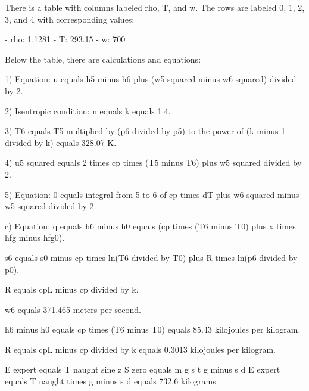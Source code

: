 There is a table with columns labeled rho, T, and w. The rows are labeled 0, 1, 2, 3, and 4 with corresponding values:

- rho: 1.1281
- T: 293.15
- w: 700

Below the table, there are calculations and equations:

1) Equation: u equals h5 minus h6 plus (w5 squared minus w6 squared) divided by 2.

2) Isentropic condition: n equals k equals 1.4.

3) T6 equals T5 multiplied by (p6 divided by p5) to the power of (k minus 1 divided by k) equals 328.07 K.

4) u5 squared equals 2 times cp times (T5 minus T6) plus w5 squared divided by 2.

5) Equation: 0 equals integral from 5 to 6 of cp times dT plus w6 squared minus w5 squared divided by 2.

c) Equation: q equals h6 minus h0 equals (cp times (T6 minus T0) plus x times hfg minus hfg0).

s6 equals s0 minus cp times ln(T6 divided by T0) plus R times ln(p6 divided by p0).

R equals cpL minus cp divided by k.

w6 equals 371.465 meters per second.

h6 minus h0 equals cp times (T6 minus T0) equals 85.43 kilojoules per kilogram.

R equals cpL minus cp divided by k equals 0.3013 kilojoules per kilogram.

E expert equals T naught sine z
S zero equals m g s t g minus s d
E expert equals T naught times g minus s d
equals 732.6 kilograms